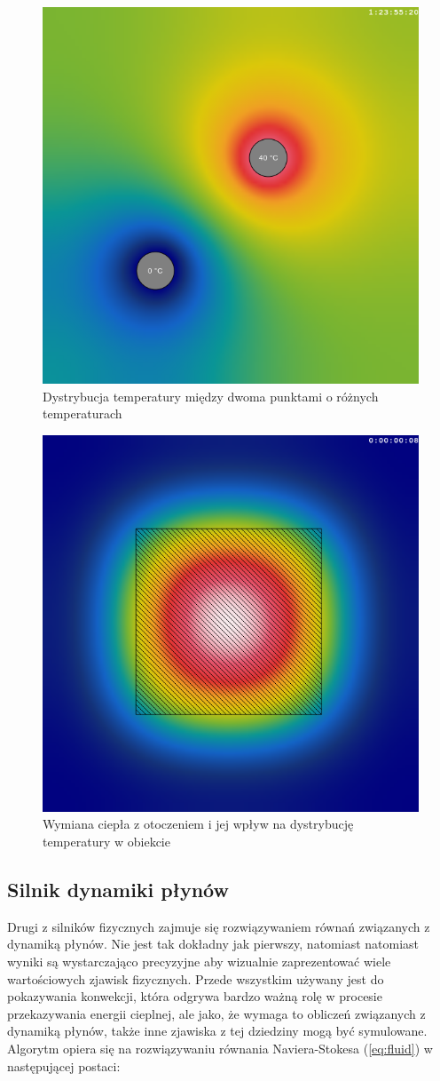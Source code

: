 \begin{figure}[!h]
\centering
\includegraphics[width=.5\textwidth]{img/heatExample1}
\caption{Dystrybucja temperatury między dwoma punktami o różnych temperaturach}
\label{fig:heatExample1}
\end{figure}

\begin{figure}[!h]
\centering
\includegraphics[width=.5\textwidth]{img/heatExample2}
\caption{Wymiana ciepła z otoczeniem i jej wpływ na dystrybucję temperatury 
w obiekcie}
\label{fig:heatExample2}
\end{figure}

\clearpage

\subsection{Silnik dynamiki płynów}

Drugi z silników fizycznych zajmuje się rozwiązywaniem równań związanych z
dynamiką płynów. Nie jest tak dokładny jak pierwszy, natomiast natomiast wyniki
są wystarczająco precyzyjne aby wizualnie zaprezentować wiele wartościowych
zjawisk fizycznych. Przede wszystkim używany jest do pokazywania konwekcji,
która odgrywa bardzo ważną rolę w procesie przekazywania energii cieplnej, ale
jako, że wymaga to obliczeń związanych z dynamiką płynów, także inne zjawiska z
tej dziedziny mogą być symulowane. Algorytm opiera się na rozwiązywaniu równania
Naviera-Stokesa (\ref{eq:fluid}) w następującej postaci:

